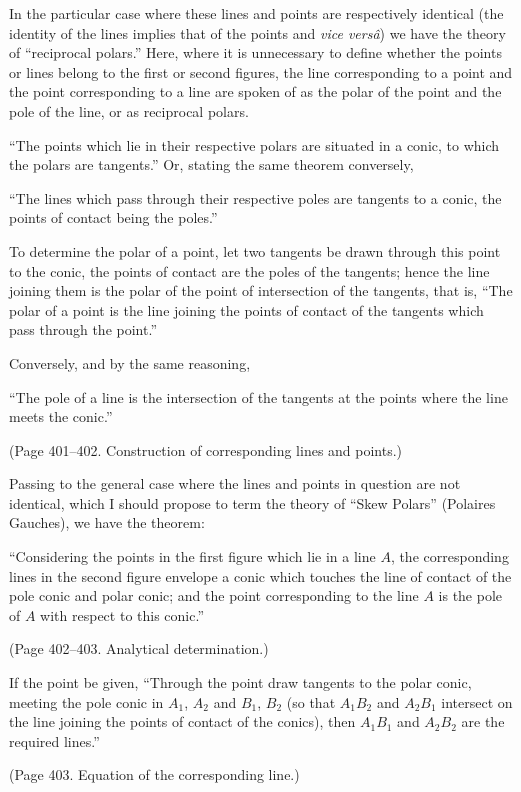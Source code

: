 \documentclass[11pt,a4paper]{article}
\theoremstyle{plain}
\theoremstyle{definition}
\begin{document}
In the particular case where these lines and points are respectively identical (the
identity of the lines implies that of the points and \textit{vice vers\^{a}}) we have the theory of
``reciprocal polars.'' Here, where it is unnecessary to define whether the points or
lines belong to the first or second figures, the line corresponding to a point and the
point corresponding to a line are spoken of as the polar of the point and the pole of
the line, or as reciprocal polars.

``The points which lie in their respective polars are situated in a conic, to which
the polars are tangents.'' Or, stating the same theorem conversely,

``The lines which pass through their respective poles are tangents to a conic, the
points of contact being the poles.''

To determine the polar of a point, let two tangents be drawn through this point to
the conic, the points of contact are the poles of the tangents; hence the line joining
them is the polar of the point of intersection of the tangents, that is, ``The polar of
a point is the line joining the points of contact of the tangents which pass through
the point.''

Conversely, and by the same reasoning,

``The pole of a line is the intersection of the tangents at the points where the
line meets the conic.''

(Page 401--402. Construction of corresponding lines and points.)

Passing to the general case where the lines and points in question are not identical,
which I should propose to term the theory of ``Skew Polars'' (Polaires Gauches), we
have the theorem:

``Considering the points in the first figure which lie in a line $A$, the corresponding
lines in the second figure envelope a conic which touches the line of contact of the
pole conic and polar conic; and the point corresponding to the line $A$ is the pole
of $A$ with respect to this conic.''

(Page 402--403. Analytical determination.)

If the point be given, ``Through the point draw tangents to the polar conic, meeting
the pole conic in $A_1$, $A_2$ and $B_1$, $B_2$ (so that $A_1B_2$ and $A_2B_1$ intersect on the line
joining the points of contact of the conics), then $A_1B_1$ and $A_2B_2$ are the required lines.''

(Page 403. Equation of the corresponding line.)
\end{document}

